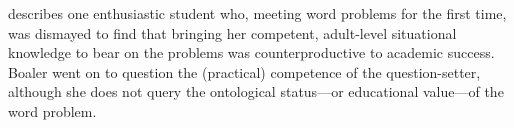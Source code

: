 



 describes one enthusiastic student who, meeting word
problems for the first time, was dismayed to find that bringing her
competent, adult-level situational knowledge to bear on the problems
was counterproductive to academic success.  Boaler went on to question
the (practical) competence of the question-setter, although she does
not query the ontological status---or educational value---of the word
problem.

